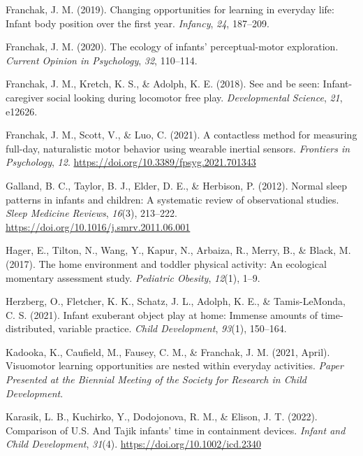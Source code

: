 \documentclass[
  man]{apa6}
\newlength{\cslhangindent}
\newlength{\cslentryspacingunit} %
\newenvironment{CSLReferences}[2] %
 {%
  \setlength{\parindent}{0pt}
  \ifodd #1
  \let\oldpar\par
  \def\par{\hangindent=\cslhangindent\oldpar}
  \fi
  \setlength{\parskip}{#2\cslentryspacingunit}
 }%
 {}
\begin{document}
\begin{CSLReferences}{1}{0}
\leavevmode{}%
Franchak, J. M. (2019). Changing opportunities for learning in everyday life: Infant body position over the first year. \emph{Infancy}, \emph{24}, 187--209.

\leavevmode{}%
Franchak, J. M. (2020). The ecology of infants' perceptual-motor exploration. \emph{Current Opinion in Psychology}, \emph{32}, 110--114.

\leavevmode{}%
Franchak, J. M., Kretch, K. S., \& Adolph, K. E. (2018). See and be seen: Infant-caregiver social looking during locomotor free play. \emph{Developmental Science}, \emph{21}, e12626.

\leavevmode{}%
Franchak, J. M., Scott, V., \& Luo, C. (2021). A contactless method for measuring full-day, naturalistic motor behavior using wearable inertial sensors. \emph{Frontiers in Psychology}, \emph{12}. \url{https://doi.org/10.3389/fpsyg.2021.701343}

\leavevmode{}%
Galland, B. C., Taylor, B. J., Elder, D. E., \& Herbison, P. (2012). Normal sleep patterns in infants and children: A systematic review of observational studies. \emph{Sleep Medicine Reviews}, \emph{16}(3), 213--222. \url{https://doi.org/10.1016/j.smrv.2011.06.001}

\leavevmode{}%
Hager, E., Tilton, N., Wang, Y., Kapur, N., Arbaiza, R., Merry, B., \& Black, M. (2017). The home environment and toddler physical activity: An ecological momentary assessment study. \emph{Pediatric Obesity}, \emph{12}(1), 1--9.

\leavevmode{}%
Herzberg, O., Fletcher, K. K., Schatz, J. L., Adolph, K. E., \& Tamis-LeMonda, C. S. (2021). Infant exuberant object play at home: Immense amounts of time-distributed, variable practice. \emph{Child Development}, \emph{93}(1), 150--164.

\leavevmode{}%
Kadooka, K., Caufield, M., Fausey, C. M., \& Franchak, J. M. (2021, April). Visuomotor learning opportunities are nested within everyday activities. \emph{Paper Presented at the Biennial Meeting of the Society for Research in Child Development}.

\leavevmode{}%
Karasik, L. B., Kuchirko, Y., Dodojonova, R. M., \& Elison, J. T. (2022). Comparison of {U.S.} And {Tajik} infants' time in containment devices. \emph{Infant and Child Development}, \emph{31}(4). \url{https://doi.org/10.1002/icd.2340}


\end{CSLReferences}
\end{document}
